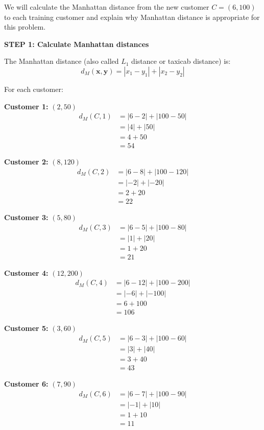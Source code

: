 \documentclass[12pt]{article}
\begin{document}
\begin{solution}
We will calculate the Manhattan distance from the new customer \(C = (6, 100)\) to each training customer and explain why Manhattan distance is appropriate for this problem.

\textbf{STEP 1: Calculate Manhattan distances}

The Manhattan distance (also called \(L_1\) distance or taxicab distance) is:
\[
d_M(\mathbf{x}, \mathbf{y}) = |x_1 - y_1| + |x_2 - y_2|
\]

For each customer:

\textbf{Customer 1:} \((2, 50)\)
\begin{align*}
d_M(C, 1) &= |6 - 2| + |100 - 50| \\
&= |4| + |50| \\
&= 4 + 50 \\
&= \boxed{54}
\end{align*}

\textbf{Customer 2:} \((8, 120)\)
\begin{align*}
d_M(C, 2) &= |6 - 8| + |100 - 120| \\
&= |-2| + |-20| \\
&= 2 + 20 \\
&= \boxed{22}
\end{align*}

\textbf{Customer 3:} \((5, 80)\)
\begin{align*}
d_M(C, 3) &= |6 - 5| + |100 - 80| \\
&= |1| + |20| \\
&= 1 + 20 \\
&= \boxed{21}
\end{align*}

\textbf{Customer 4:} \((12, 200)\)
\begin{align*}
d_M(C, 4) &= |6 - 12| + |100 - 200| \\
&= |-6| + |-100| \\
&= 6 + 100 \\
&= \boxed{106}
\end{align*}

\textbf{Customer 5:} \((3, 60)\)
\begin{align*}
d_M(C, 5) &= |6 - 3| + |100 - 60| \\
&= |3| + |40| \\
&= 3 + 40 \\
&= \boxed{43}
\end{align*}

\textbf{Customer 6:} \((7, 90)\)
\begin{align*}
d_M(C, 6) &= |6 - 7| + |100 - 90| \\
&= |-1| + |10| \\
&= 1 + 10 \\
&= \boxed{11}
\end{align*}


\end{solution}
\end{document}

